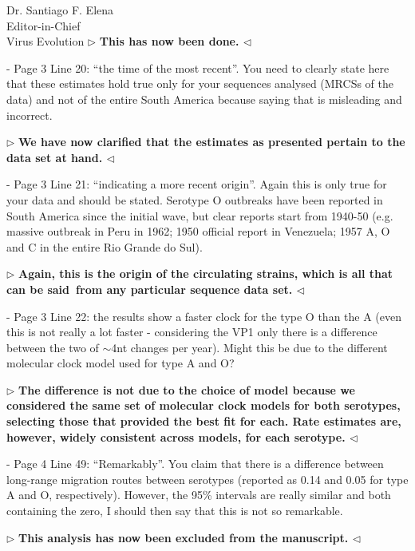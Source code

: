 \documentclass[12pt, a4paper]{letter} %
\newenvironment{reply}{$\triangleright$\bf}{$\triangleleft$}
\begin{document}
\begin{letter}{
	Dr. Santiago F. Elena\\
    Editor-in-Chief \\
    Virus Evolution
}
\begin{reply}
This has now been done.
\end{reply}

-       Page 3 Line 20: ``the time of the most recent''. 
You need to clearly state here that these estimates hold true only for your sequences analysed (MRCSs of the data) and not of the entire South America because saying that is misleading and incorrect.

\begin{reply}
We have now clarified that the estimates as presented pertain to the data set at hand.
\end{reply}

-       Page 3 Line 21: ``indicating a more recent origin''. 
Again this is only true for your data and should be stated. 
Serotype O outbreaks have been reported in South America since the initial wave, but clear reports start from 1940-50 (e.g. massive outbreak in Peru in 1962; 1950 official report in Venezuela; 1957 A, O and C in the entire Rio Grande do Sul).

\begin{reply}
Again, this is the origin of the circulating strains, which is all that can be said~\textbf{from any particular sequence data set}.
\end{reply}

-       Page 3 Line 22: the results show a faster clock for the type O than the A (even this is not really a lot faster - considering the VP1 only there is a difference between the two of $\sim$4nt changes per year). 
Might this be due to the different molecular clock model used for type A and O?

\begin{reply}
The difference is not due to the choice of model because we considered the same set of molecular clock models for both serotypes, selecting those that provided the best fit for each.
Rate estimates are, however, widely consistent across models, for each serotype.
\end{reply}

-       Page 4 Line 49: ``Remarkably''. 
You claim that there is a difference between long-range migration routes between serotypes (reported as 0.14 and 0.05 for type A and O, respectively). 
However, the 95\% intervals are really similar and both containing the zero, I should then say that this is not so remarkable.

\begin{reply}
This analysis has now been excluded from the manuscript.
\end{reply}


\end{letter}
\end{document}
